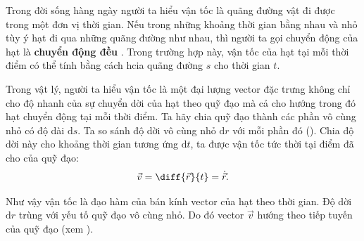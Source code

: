 Trong đời sống hàng ngày người ta hiểu vận tốc là quãng đường vật đi được trong một đơn vị thời gian. Nếu trong những khoảng thời gian bằng nhau và nhỏ tùy ý hạt đi qua những quãng đường như nhau, thì người ta gọi chuyển động của hạt là \textbf{chuyển động đều} . Trong trường hợp này, vận tốc của hạt tại mỗi thời điểm có thể tính bằng cách hcia quãng đường $s$ cho thời gian $t$.

Trong vật lý, người ta hiểu vận tốc là một đại lượng vector đặc trưng không chỉ cho độ nhanh của sự chuyển dời của hạt theo quỹ đạo mà cả cho hướng trong đó hạt chuyển động tại mỗi thời điểm. Ta hãy chia quỹ đạo thành các phần vô cùng nhỏ có độ dài $\mathrm{d}s$. Ta so sánh độ dời vô cùng nhỏ $\mathrm{d}r$ với mỗi phần đó (). Chia độ dời này cho khoảng thời gian tương ứng $\mathrm{d}t$, ta được vận tốc tức thời tại điểm đã cho của quỹ đạo:
\begin{equation}\label{eq:1_57}
\vec{v} = \diff{\vec{r}}{t} = \dot{\vec{r}}.
\end{equation}

\noindent
Như vậy vận tốc là đạo hàm của bán kính vector của hạt theo thời gian. Độ dời $\mathrm{d}r$ trùng với yếu tố quỹ đạo vô cùng nhỏ. Do đó vector $\vec{v}$ hướng theo tiếp tuyến của quỹ đạo (xem ).


